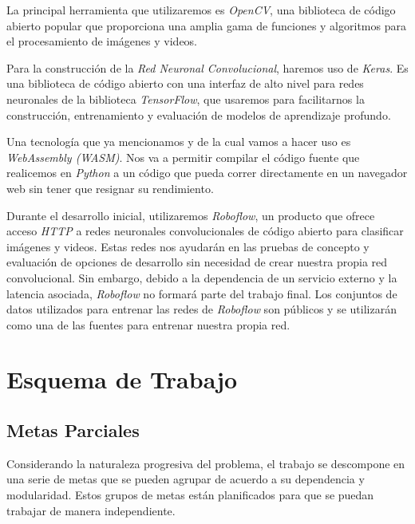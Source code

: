 \documentclass[a4paper]{article}
\begin{document}
La principal herramienta que utilizaremos es \emph{OpenCV}, una biblioteca de código abierto popular que proporciona una amplia gama de funciones y algoritmos para el procesamiento de imágenes y videos.

Para la construcción de la \emph{Red Neuronal Convolucional}, haremos uso de \emph{Keras}. Es una biblioteca de código abierto con una interfaz de alto nivel para redes neuronales de la biblioteca \emph{TensorFlow}, que usaremos para facilitarnos la construcción, entrenamiento y evaluación de modelos de aprendizaje profundo.

Una tecnología que ya mencionamos y de la cual vamos a hacer uso es \emph{WebAssembly (WASM)}. Nos va a permitir compilar el código fuente que realicemos en \emph{Python} a un código que pueda correr directamente en un navegador web sin tener que resignar su rendimiento.

Durante el desarrollo inicial, utilizaremos \emph{Roboflow}, un producto que ofrece acceso \emph{HTTP} a redes neuronales convolucionales de código abierto para clasificar imágenes y videos. Estas redes nos ayudarán en las pruebas de concepto y evaluación de opciones de desarrollo sin necesidad de crear nuestra propia red convolucional.
Sin embargo, debido a la dependencia de un servicio externo y la latencia asociada, \emph{Roboflow} no formará parte del trabajo final. Los conjuntos de datos utilizados para entrenar las redes de \emph{Roboflow} son públicos y se utilizarán como una de las fuentes para entrenar nuestra propia red.

\section{Esquema de Trabajo}
\subsection{Metas Parciales}

Considerando la naturaleza progresiva del problema, el trabajo se descompone en una serie de metas que se pueden agrupar de acuerdo a su dependencia y modularidad. Estos grupos de metas están planificados para que se puedan trabajar de manera independiente.
\end{document}
